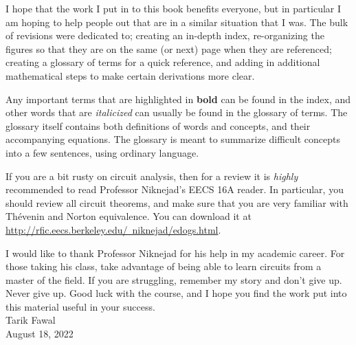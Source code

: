 I hope that the work I put in to this book benefits everyone, but in particular I am hoping to help people out that are in a similar situation that I was.  The bulk of revisions were dedicated to; creating an in-depth index, re-organizing the figures so that they are on the same (or next) page when they are referenced; creating a glossary of terms for a quick reference, and adding in additional mathematical steps to make certain derivations more clear.

Any important terms that are highlighted in \textbf{bold} can be found in the index, and other words that are \textit{italicized} can usually be found in the glossary of terms.  The glossary itself contains both definitions of words and concepts, and their accompanying equations.  The glossary is meant to summarize difficult concepts into a few sentences, using ordinary language.

If you are a bit rusty on circuit analysis, then for a review it is \emph{highly} recommended to read Professor Niknejad's EECS 16A reader.  In particular, you should review all circuit theorems, and make sure that you are very familiar with Thévenin and Norton equivalence.  You can download it at \href{http://rfic.eecs.berkeley.edu/~niknejad/edogs.html}{http://rfic.eecs.berkeley.edu/~niknejad/edogs.html}.

I would like to thank Professor Niknejad for his help in my academic career.  For those taking his class, take advantage of being able to learn circuits from a master of the field.  If you are struggling, remember my story and don't give up.  Never give up.  Good luck with the course, and I hope you find the work put into this material useful in your success.\\[0.5cm]
\noindent
Tarik Fawal\\[0.15cm]
August 18, 2022